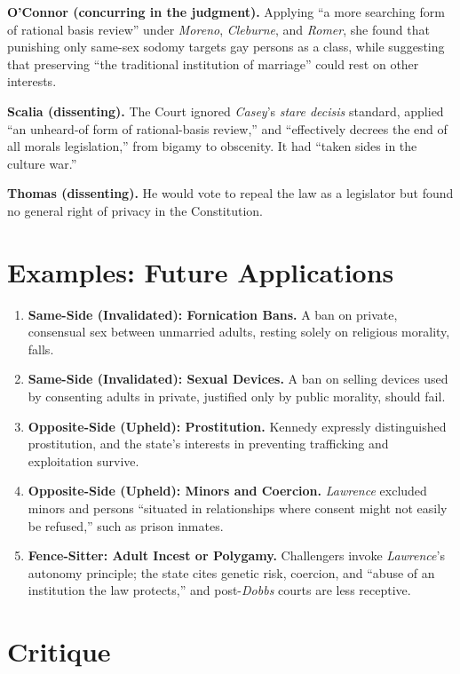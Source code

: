 \documentclass[12pt]{article}
\begin{document}
\textbf{O'Connor (concurring in the judgment).} Applying ``a more searching form of rational basis review'' under \textit{Moreno}, \textit{Cleburne}, and \textit{Romer}, she found that punishing only same-sex sodomy targets gay persons as a class, while suggesting that preserving ``the traditional institution of marriage'' could rest on other interests.

\textbf{Scalia (dissenting).} The Court ignored \textit{Casey}'s \textit{stare decisis} standard, applied ``an unheard-of form of rational-basis review,'' and ``effectively decrees the end of all morals legislation,'' from bigamy to obscenity. It had ``taken sides in the culture war.''

\textbf{Thomas (dissenting).} He would vote to repeal the law as a legislator but found no general right of privacy in the Constitution.

\section{Examples: Future Applications}

\begin{enumerate}
\item \textbf{Same-Side (Invalidated): Fornication Bans.} A ban on private, consensual sex between unmarried adults, resting solely on religious morality, falls.
\item \textbf{Same-Side (Invalidated): Sexual Devices.} A ban on selling devices used by consenting adults in private, justified only by public morality, should fail.
\item \textbf{Opposite-Side (Upheld): Prostitution.} Kennedy expressly distinguished prostitution, and the state's interests in preventing trafficking and exploitation survive.
\item \textbf{Opposite-Side (Upheld): Minors and Coercion.} \textit{Lawrence} excluded minors and persons ``situated in relationships where consent might not easily be refused,'' such as prison inmates.
\item \textbf{Fence-Sitter: Adult Incest or Polygamy.} Challengers invoke \textit{Lawrence}'s autonomy principle; the state cites genetic risk, coercion, and ``abuse of an institution the law protects,'' and post-\textit{Dobbs} courts are less receptive.
\end{enumerate}

\section{Critique}
\end{document}
